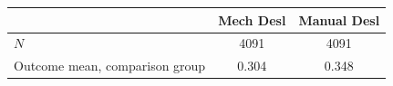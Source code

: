 \begin{tabular}{lcc}
\hline\hline
 & Mech Desl & Manual Desl \\
\hline
\hline
$N$ & 4091 & 4091 \\
Outcome mean, comparison group & 0.304 & 0.348 \\
\hline\hline
\end{tabular}

